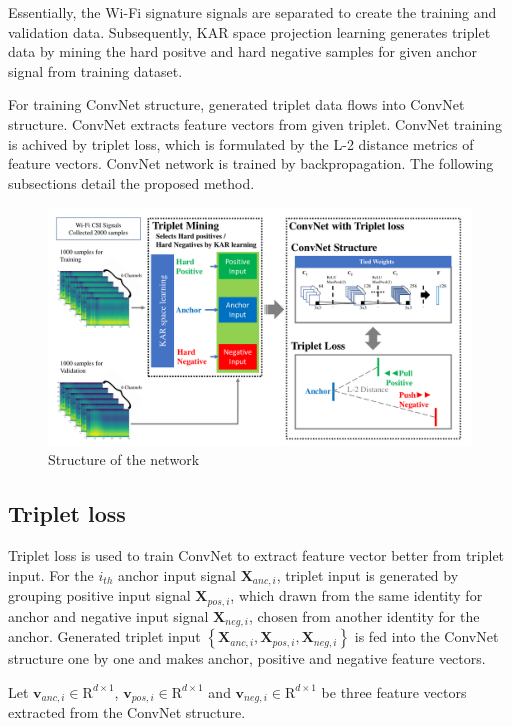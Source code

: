 \documentclass[runningheads]{llncs}
\begin{document}
Essentially, the Wi-Fi signature signals are separated to create the training and validation data. Subsequently, KAR space projection learning generates triplet data by mining the hard positve and hard negative samples for given anchor signal from training dataset.

For training ConvNet structure, generated triplet data flows into ConvNet structure. ConvNet extracts feature vectors from given triplet.
ConvNet training is achived by triplet loss, which is formulated by the L-2 distance metrics of feature vectors. ConvNet network is trained by backpropagation. The following subsections detail the proposed method.

\begin{figure}
    \includegraphics[width=\textwidth]{fig1_tcnn_kar_v1}
    \caption{Structure of the network} \label{fig1}
\end{figure}

\subsection{Triplet loss}

Triplet loss is used to train ConvNet to extract feature vector better from triplet input.
For the $i_{th}$ anchor input signal $\mathbf{X}_{anc,i}$, triplet input is generated by grouping positive input signal $\mathbf{X}_{pos,i}$, which drawn from the same identity for anchor and negative input signal $\mathbf{X}_{neg,i}$, chosen from another identity for the anchor.
Generated triplet input $\left\{\mathbf{X}_{anc,i},\mathbf{X}_{pos,i},\mathbf{X}_{neg,i}\right\}$ is fed into the ConvNet structure one by one and makes anchor, positive and negative feature vectors.

Let $\mathbf{v}_{anc,i}\in{\mathrm{R}}^{d\times1}$, $\mathbf{v}_{pos,i}\in{\mathrm{R}}^{d\times1}$ and $\mathbf{v}_{neg,i}\in{\mathrm{R}}^{d\times1}$ be three feature vectors extracted from the ConvNet structure. 
\end{document}
